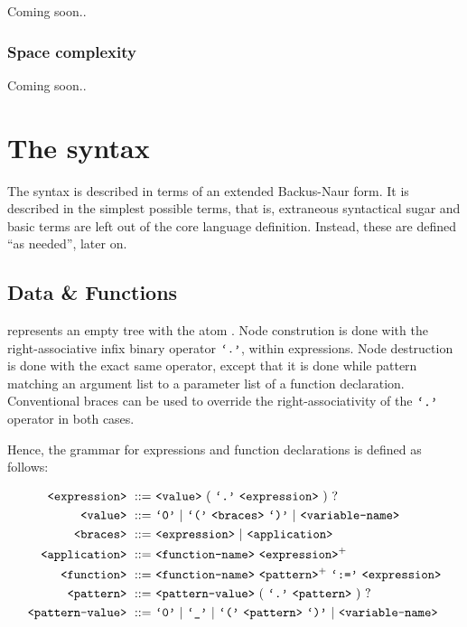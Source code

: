 Coming soon..

\subsubsection{Space complexity}

Coming soon..

\section{The syntax}\label{section:d-syntax}

The syntax is described in terms of an extended Backus-Naur form\footnotemark.
It is described in the simplest possible terms, that is, extraneous syntactical
sugar and basic terms are left out of the core language definition.  Instead,
these are defined ``as needed'', later on.


\subsection{Data \& Functions}

 represents an empty tree with the atom . Node constrution is
done with the right-associative infix binary operator $\text{{\ttfamily`.'}}$, within
expressions. Node destruction is done with the exact same operator, except that
it is done while pattern matching an argument list to a parameter list of a
function declaration. Conventional braces can be used to override the
right-associativity of the $\text{{\ttfamily`.'}}$ operator in both cases.

Hence, the grammar for expressions and function declarations is defined as
follows:

\begin{align}
\nonterm{expression}\ ::=&\ \nonterm{value}\ (\ \term{.}\ \nonterm{expression}
\ )\ ?\\
\nonterm{value}\ ::=&\ \term{0}\ |\ \term{(}\ \nonterm{braces}\ \term{)}\ |
\ \nonterm{variable-name}\\
\nonterm{braces}\ ::=&\ \nonterm{expression}\ |
\ \nonterm{application}\\
\nonterm{application}\ ::=&\ \nonterm{function-name}
\ \nonterm{expression}^+\\
\nonterm{function}\ ::=&\ \nonterm{function-name}\ \nonterm{pattern}^+
\ \term{:=}\ \nonterm{expression}\\
\nonterm{pattern}\ ::=&\ \nonterm{pattern-value}\ (\ \term{.}
\ \nonterm{pattern}\ )\ ?\\
\nonterm{pattern-value}\ ::=&\ \term{0}\ |\ \term{\_}\ |\ \term{(}
\ \nonterm{pattern}\ \term{)}\ |\ \nonterm{variable-name}
\end{align}


